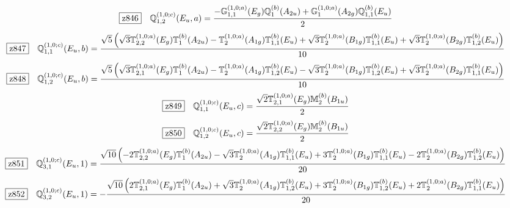 \documentclass[fleqn,10pt,landscape]{jsarticle}
\begin{document}
\begin{dmath*}
\hspace*{3mm}\fbox{z846}\quad \mathbb{Q}_{1,2}^{(1,0;c)}(E_{u},a)=\frac{- \mathbb{G}_{1,1}^{(1,0;a)}(E_{g}) \mathbb{Q}_{1}^{(b)}(A_{2u}) + \mathbb{G}_{1}^{(1,0;a)}(A_{2g}) \mathbb{Q}_{1,1}^{(b)}(E_{u})}{2}
\end{dmath*}
\begin{dmath*}
\hspace*{3mm}\fbox{z847}\quad \mathbb{Q}_{1,1}^{(1,0;c)}(E_{u},b)=\frac{\sqrt{5} \left(\sqrt{3} \mathbb{T}_{2,2}^{(1,0;a)}(E_{g}) \mathbb{T}_{1}^{(b)}(A_{2u}) - \mathbb{T}_{2}^{(1,0;a)}(A_{1g}) \mathbb{T}_{1,1}^{(b)}(E_{u}) + \sqrt{3} \mathbb{T}_{2}^{(1,0;a)}(B_{1g}) \mathbb{T}_{1,1}^{(b)}(E_{u}) + \sqrt{3} \mathbb{T}_{2}^{(1,0;a)}(B_{2g}) \mathbb{T}_{1,2}^{(b)}(E_{u})\right)}{10}
\end{dmath*}
\begin{dmath*}
\hspace*{3mm}\fbox{z848}\quad \mathbb{Q}_{1,2}^{(1,0;c)}(E_{u},b)=\frac{\sqrt{5} \left(\sqrt{3} \mathbb{T}_{2,1}^{(1,0;a)}(E_{g}) \mathbb{T}_{1}^{(b)}(A_{2u}) - \mathbb{T}_{2}^{(1,0;a)}(A_{1g}) \mathbb{T}_{1,2}^{(b)}(E_{u}) - \sqrt{3} \mathbb{T}_{2}^{(1,0;a)}(B_{1g}) \mathbb{T}_{1,2}^{(b)}(E_{u}) + \sqrt{3} \mathbb{T}_{2}^{(1,0;a)}(B_{2g}) \mathbb{T}_{1,1}^{(b)}(E_{u})\right)}{10}
\end{dmath*}
\begin{dmath*}
\hspace*{3mm}\fbox{z849}\quad \mathbb{Q}_{1,1}^{(1,0;c)}(E_{u},c)=\frac{\sqrt{2} \mathbb{T}_{2,1}^{(1,0;a)}(E_{g}) \mathbb{M}_{2}^{(b)}(B_{1u})}{2}
\end{dmath*}
\begin{dmath*}
\hspace*{3mm}\fbox{z850}\quad \mathbb{Q}_{1,2}^{(1,0;c)}(E_{u},c)=\frac{\sqrt{2} \mathbb{T}_{2,2}^{(1,0;a)}(E_{g}) \mathbb{M}_{2}^{(b)}(B_{1u})}{2}
\end{dmath*}
\begin{dmath*}
\hspace*{3mm}\fbox{z851}\quad \mathbb{Q}_{3,1}^{(1,0;c)}(E_{u},1)=\frac{\sqrt{10} \left(- 2 \mathbb{T}_{2,2}^{(1,0;a)}(E_{g}) \mathbb{T}_{1}^{(b)}(A_{2u}) - \sqrt{3} \mathbb{T}_{2}^{(1,0;a)}(A_{1g}) \mathbb{T}_{1,1}^{(b)}(E_{u}) + 3 \mathbb{T}_{2}^{(1,0;a)}(B_{1g}) \mathbb{T}_{1,1}^{(b)}(E_{u}) - 2 \mathbb{T}_{2}^{(1,0;a)}(B_{2g}) \mathbb{T}_{1,2}^{(b)}(E_{u})\right)}{20}
\end{dmath*}
\begin{dmath*}
\hspace*{3mm}\fbox{z852}\quad \mathbb{Q}_{3,2}^{(1,0;c)}(E_{u},1)=- \frac{\sqrt{10} \left(2 \mathbb{T}_{2,1}^{(1,0;a)}(E_{g}) \mathbb{T}_{1}^{(b)}(A_{2u}) + \sqrt{3} \mathbb{T}_{2}^{(1,0;a)}(A_{1g}) \mathbb{T}_{1,2}^{(b)}(E_{u}) + 3 \mathbb{T}_{2}^{(1,0;a)}(B_{1g}) \mathbb{T}_{1,2}^{(b)}(E_{u}) + 2 \mathbb{T}_{2}^{(1,0;a)}(B_{2g}) \mathbb{T}_{1,1}^{(b)}(E_{u})\right)}{20}
\end{dmath*}
\end{document}
